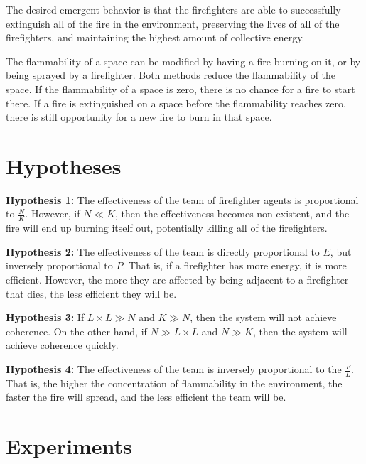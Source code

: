 \documentclass{article}
\begin{document}
The desired emergent behavior is that the firefighters are able to
successfully extinguish all of the fire in the environment, preserving
the lives of all of the firefighters, and maintaining the highest
amount of collective energy.

The flammability of a space can be modified by having a fire burning on it,
or by being sprayed by a firefighter.  Both methods reduce the flammability
of the space.  If the flammability of a space is zero, there is no chance
for a fire to start there.  If a fire is extinguished on a space before the
flammability reaches zero, there is still opportunity for a new fire to
burn in that space.

\section{Hypotheses}

\begin{description}

  \item \textbf{Hypothesis 1:}
    The effectiveness of the team of firefighter agents is proportional to
    $\frac{N}{K}$.  However, if $N \ll K$, then the effectiveness becomes
    non-existent, and the fire will end up burning itself out, potentially
    killing all of the firefighters.
  
  \item \textbf{Hypothesis 2:}
    The effectiveness of the team is directly proportional to $E$, but
    inversely proportional to $P$.  That is, if a firefighter has more 
    energy, it is more efficient.  However, the more they are affected by
    being adjacent to a firefighter that dies, the less efficient they will
    be.

  \item \textbf{Hypothesis 3:}
    If $L \times L \gg N$ and $K \gg N$, then the system will not achieve
    coherence.  On the other hand, if $N \gg L \times L$ and $N \gg K$, then
    the system will achieve coherence quickly.

  \item \textbf{Hypothesis 4:}
    The effectiveness of the team is inversely proportional to the $\frac{F}{L}$.
    That is, the higher the concentration of flammability in the environment,
    the faster the fire will spread, and the less efficient the team will be.

\end{description}

\section{Experiments}
\end{document}
